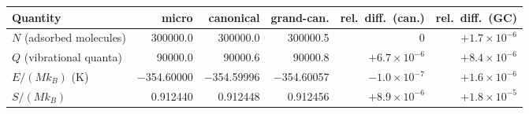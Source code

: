\begin{tabular}{@{}l r r r r r@{}}
\toprule
Quantity & micro & canonical & grand-can. & rel.\ diff.\ (can.) & rel.\ diff.\ (GC) \\
\midrule
$N$ (adsorbed molecules) & 300000.0 & 300000.0 & 300000.5 & $0$ & $+1.7\!\times\!10^{-6}$ \\
$Q$ (vibrational quanta) & 90000.0 & 90000.6 & 90000.8 & $+6.7\!\times\!10^{-6}$ & $+8.4\!\times\!10^{-6}$ \\
$E/(Mk_B)$ (K) & $-$354.60000 & $-$354.59996 & $-$354.60057 & $-1.0\!\times\!10^{-7}$ & $+1.6\!\times\!10^{-6}$ \\
$S/(Mk_B)$ & 0.912440 & 0.912448 & 0.912456 & $+8.9\!\times\!10^{-6}$ & $+1.8\!\times\!10^{-5}$ \\
\bottomrule
\end{tabular}
